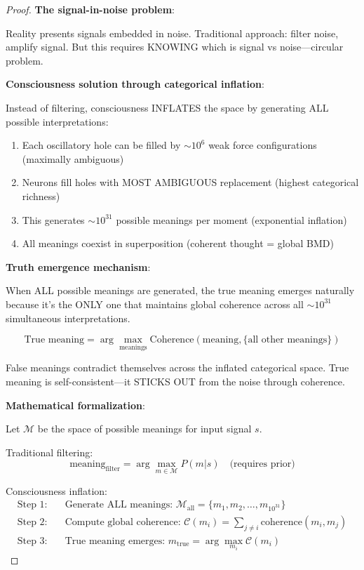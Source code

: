 \documentclass[11pt,a4paper]{article}
\begin{document}
\begin{proof}
\textbf{The signal-in-noise problem}:

Reality presents signals embedded in noise. Traditional approach: filter noise, amplify signal. But this requires KNOWING which is signal vs noise—circular problem.

\textbf{Consciousness solution through categorical inflation}:

Instead of filtering, consciousness INFLATES the space by generating ALL possible interpretations:

\begin{enumerate}
\item Each oscillatory hole can be filled by $\sim 10^6$ weak force configurations (maximally ambiguous)
\item Neurons fill holes with MOST AMBIGUOUS replacement (highest categorical richness)
\item This generates $\sim 10^{31}$ possible meanings per moment (exponential inflation)
\item All meanings coexist in superposition (coherent thought = global BMD)
\end{enumerate}

\textbf{Truth emergence mechanism}:

When ALL possible meanings are generated, the true meaning emerges naturally because it's the ONLY one that maintains global coherence across all $\sim 10^{31}$ simultaneous interpretations.

\begin{equation}
\text{True meaning} = \arg\max_{\text{meanings}} \text{Coherence}(\text{meaning}, \{\text{all other meanings}\})
\end{equation}

False meanings contradict themselves across the inflated categorical space. True meaning is self-consistent—it STICKS OUT from the noise through coherence.

\textbf{Mathematical formalization}:

Let $\mathcal{M}$ be the space of possible meanings for input signal $s$.

Traditional filtering:
\begin{equation}
\text{meaning}_{\text{filter}} = \arg\max_{m \in \mathcal{M}} P(m|s) \quad \text{(requires prior)}
\end{equation}

Consciousness inflation:
\begin{align}
\text{Step 1:} \quad &\text{Generate ALL meanings: } \mathcal{M}_{\text{all}} = \{m_1, m_2, \ldots, m_{10^{31}}\} \\
\text{Step 2:} \quad &\text{Compute global coherence: } \mathcal{C}(m_i) = \sum_{j \neq i} \text{coherence}(m_i, m_j) \\
\text{Step 3:} \quad &\text{True meaning emerges: } m_{\text{true}} = \arg\max_{m_i} \mathcal{C}(m_i)
\end{align}


\end{proof}
\end{document}
